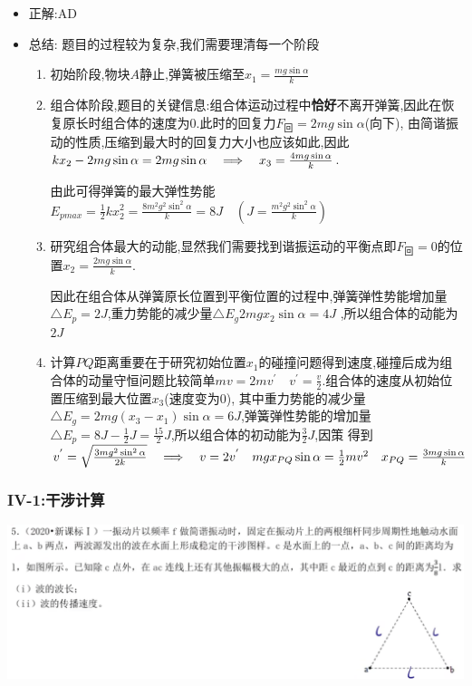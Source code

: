 \documentclass{article}
\begin{document}
\begin{itemize}
    \item 正解:AD
    \item 总结:
    题目的过程较为复杂,我们需要理清每一个阶段
    \begin{enumerate}
        \item 初始阶段,物块$A$静止,弹簧被压缩至$x_{1} = \frac{mg\sin{\alpha}}{k}$
        \item 组合体阶段,题目的关键信息:组合体运动过程中\textbf{恰好}不离开弹簧,因此在恢复原长时组合体的速度为$0$.此时的回复力$F_{\text{回}} = 2mg\sin{\alpha}$(向下),
        由简谐振动的性质,压缩到最大时的回复力大小也应该如此,因此$kx_{2} - 2mg\sin{\alpha} = 2mg\sin{\alpha} \quad \Longrightarrow \quad x_{3} = \frac{4mg\sin{\alpha}}{k}$.
        
        由此可得弹簧的最大弹性势能$ E_{pmax} = \frac{1}{2}kx_{2}^{2} = \frac{8m^{2}g^{2}\sin^{2}{\alpha}}{k} = 8J \quad (J = \frac{m^{2}g^{2}\sin^{2}{\alpha}}{k} )$

        \item 研究组合体最大的动能,显然我们需要找到谐振运动的平衡点即$F_{\text{回}} = 0$的位置$x_{2} = \frac{2mg\sin{\alpha}}{k} $.
        
        因此在组合体从弹簧原长位置到平衡位置的过程中,弹簧弹性势能增加量$ \triangle E_{p} = 2J $,重力势能的减少量$ \triangle E_{g}2mgx_{2}\sin{\alpha} = 4J $ ,所以组合体的动能为$2J$

        \item 计算$PQ$距离重要在于研究初始位置$x_{1}$的碰撞问题得到速度,碰撞后成为组合体的动量守恒问题比较简单$ mv = 2mv^{'} \quad v^{'} = \frac{v}{2} $.组合体的速度从初始位置压缩到最大位置$x_{3}$(速度变为$0$),
        其中重力势能的减少量$ \triangle E_{g} = 2mg(x_{3} - x_{1})\sin{\alpha} = 6J$,弹簧弹性势能的增加量$ \triangle E_{p} = 8J - \frac{1}{2}J  = \frac{15}{2}J$,所以组合体的初动能为$\frac{3}{2}J$,因策
        得到$v^{'} = \sqrt{\frac{3mg^{2}\sin^{2}{\alpha}}{2k}} \quad \Longrightarrow \quad v = 2 v^{'} \quad mgx_{PQ}\sin{\alpha} = \frac{1}{2}mv^{2} \quad x_{PQ} = \frac{3mg\sin{\alpha}}{k} $
    \end{enumerate}
\end{itemize}


\vspace{2em}

\subsubsection{IV-1:干涉计算}
\includegraphics[width = 50em]{./pictures/2.1-4.png}
\end{document}
